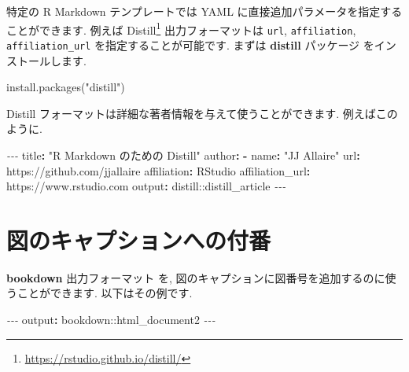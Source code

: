\documentclass[
  11pt,
]{bxjsreport}
\newenvironment{Shaded}{\begin{snugshade}}{\end{snugshade}}
\newcommand{\AttributeTok}[1]{\textcolor[rgb]{0.77,0.63,0.00}{#1}}
\newcommand{\FunctionTok}[1]{\textcolor[rgb]{0.00,0.00,0.00}{#1}}
\newcommand{\KeywordTok}[1]{\textcolor[rgb]{0.13,0.29,0.53}{\textbf{#1}}}
\newcommand{\NormalTok}[1]{#1}
\newcommand{\PreprocessorTok}[1]{\textcolor[rgb]{0.56,0.35,0.01}{\textit{#1}}}
\newcommand{\StringTok}[1]{\textcolor[rgb]{0.31,0.60,0.02}{#1}}
\renewcommand{\href}[2]{#2\footnote{\url{#1}}}
\begin{document}
特定の R Markdown テンプレートでは YAML に直接追加パラメータを指定することができます. 例えば \href{https://rstudio.github.io/distill/}{Distill} 出力フォーマットは \texttt{url}, \texttt{affiliation}, \texttt{affiliation\_url} を指定することが可能です. まずは \textbf{distill} パッケージ \autocite{R-distill} をインストールします.

\begin{Shaded}
\begin{Highlighting}[numbers=left,,]
\FunctionTok{install.packages}\NormalTok{(}\StringTok{"distill"}\NormalTok{)}
\end{Highlighting}
\end{Shaded}

Distill フォーマットは詳細な著者情報を与えて使うことができます. 例えばこのように.

\begin{Shaded}
\begin{Highlighting}[]
\PreprocessorTok{{-}{-}{-}}
\FunctionTok{title}\KeywordTok{:}\AttributeTok{ }\StringTok{"R Markdown のための Distill"}
\FunctionTok{author}\KeywordTok{:}
\AttributeTok{  }\KeywordTok{{-}}\AttributeTok{ }\FunctionTok{name}\KeywordTok{:}\AttributeTok{ }\StringTok{"JJ Allaire"}
\AttributeTok{    }\FunctionTok{url}\KeywordTok{:}\AttributeTok{ https://github.com/jjallaire}
\AttributeTok{    }\FunctionTok{affiliation}\KeywordTok{:}\AttributeTok{ RStudio}
\AttributeTok{    }\FunctionTok{affiliation\_url}\KeywordTok{:}\AttributeTok{ https://www.rstudio.com}
\FunctionTok{output}\KeywordTok{:}\AttributeTok{ distill::distill\_article}
\PreprocessorTok{{-}{-}{-}}
\end{Highlighting}
\end{Shaded}

\hypertarget{figure-number}{%
\section{図のキャプションへの付番}\label{figure-number}}

\textbf{bookdown} \autocite{R-bookdown} 出力フォーマット を, 図のキャプションに図番号を追加するのに使うことができます. 以下はその例です.

\begin{Shaded}
\begin{Highlighting}[]
\PreprocessorTok{{-}{-}{-}}
\FunctionTok{output}\KeywordTok{:}\AttributeTok{ bookdown::html\_document2}
\PreprocessorTok{{-}{-}{-}}
\end{Highlighting}
\end{Shaded}
\end{document}
